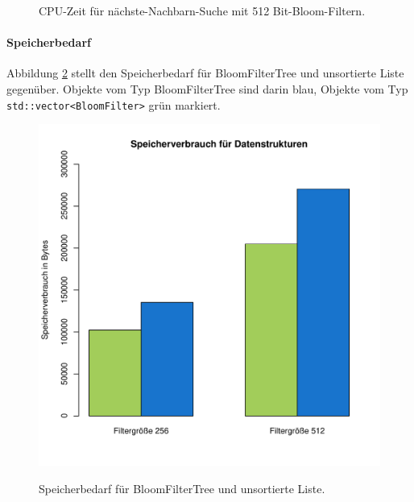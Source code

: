 \begin{figure}[hptb]
	\caption[CPU-Zeit für 3-nächste-Nachbarn-Suche mit 512 Bit-Bloom-Filtern]{CPU-Zeit für nächste-Nachbarn-Suche mit 512 Bit-Bloom-Filtern.}\label{fig:pic16}
\end{figure}
\paragraph*{Speicherbedarf}
Abbildung \ref{fig:pic17} stellt den Speicherbedarf für BloomFilterTree und unsortierte Liste gegenüber. Objekte vom Typ BloomFilterTree sind darin blau, Objekte vom Typ \texttt{std::vector<BloomFilter>} grün markiert. 
\begin{figure}[hptb]
	\centering
	\includegraphics[scale=0.7]{pictures/mem.pdf}\\
	\caption[Speicherbedarf für BloomFilterTree und unsortierte Liste]{Speicherbedarf für BloomFilterTree und unsortierte Liste.}\label{fig:pic17} 
\end{figure}	
